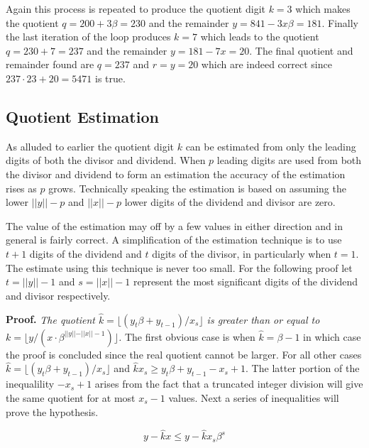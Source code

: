 \documentclass[b5paper]{book}
\begin{document}
Again this process is repeated to produce the quotient digit $k = 3$ which makes the quotient $q = 200 + 3\beta = 230$ and the remainder 
$y = 841 - 3x\beta = 181$.  Finally the last iteration of the loop produces $k = 7$ which leads to the quotient $q = 230 + 7 = 237$ and the
remainder $y = 181 - 7x = 20$.  The final quotient and remainder found are $q = 237$ and $r = y = 20$ which are indeed correct since 
$237 \cdot 23 + 20 = 5471$ is true.  

\subsection{Quotient Estimation}
\label{sec:divest}
As alluded to earlier the quotient digit $k$ can be estimated from only the leading digits of both the divisor and dividend.  When $p$ leading
digits are used from both the divisor and dividend to form an estimation the accuracy of the estimation rises as $p$ grows.  Technically
speaking the estimation is based on assuming the lower $\vert \vert y \vert \vert - p$ and $\vert \vert x \vert \vert - p$ lower digits of the
dividend and divisor are zero.  

The value of the estimation may off by a few values in either direction and in general is fairly correct.  A simplification \cite[pp. 271]{TAOCPV2}
of the estimation technique is to use $t + 1$ digits of the dividend and $t$ digits of the divisor, in particularly when $t = 1$.  The estimate 
using this technique is never too small.  For the following proof let $t = \vert \vert y \vert \vert - 1$ and $s = \vert \vert x \vert \vert - 1$ 
represent the most significant digits of the dividend and divisor respectively.

\textbf{Proof.}\textit{  The quotient $\hat k = \lfloor (y_t\beta + y_{t-1}) / x_s \rfloor$ is greater than or equal to 
$k = \lfloor y / (x \cdot \beta^{\vert \vert y \vert \vert - \vert \vert x \vert \vert - 1}) \rfloor$. }
The first obvious case is when $\hat k = \beta - 1$ in which case the proof is concluded since the real quotient cannot be larger.  For all other 
cases $\hat k = \lfloor (y_t\beta + y_{t-1}) / x_s \rfloor$ and $\hat k x_s \ge y_t\beta + y_{t-1} - x_s + 1$.  The latter portion of the inequalility
$-x_s + 1$ arises from the fact that a truncated integer division will give the same quotient for at most $x_s - 1$ values.  Next a series of 
inequalities will prove the hypothesis.

\begin{equation}
y - \hat k x \le y - \hat k x_s\beta^s
\end{equation}
\end{document}
